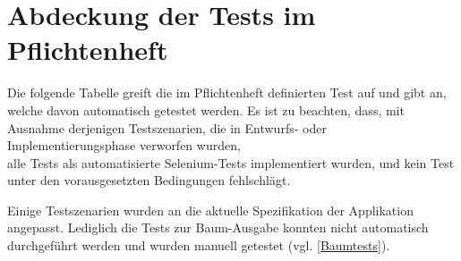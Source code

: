 \documentclass[parskip=full,11pt,openany]{scrreprt}
\begin{document}
\section{Abdeckung der Tests im Pflichtenheft}

Die folgende Tabelle greift die im Pflichtenheft definierten Test auf und gibt an,
welche davon automatisch getestet werden. 
Es ist zu beachten, dass, mit Ausnahme derjenigen Testszenarien, die in Entwurfs- oder
Implementierungsphase verworfen wurden, \\ alle Tests als automatisierte Selenium-Tests implementiert wurden, und kein Test unter den vorausgesetzten Bedingungen fehlschlägt.

Einige Testszenarien wurden an die aktuelle Spezifikation der Applikation angepasst. 
Lediglich die Tests zur Baum-Ausgabe konnten nicht automatisch durchgeführt werden und wurden manuell getestet (vgl. \ref{Baumtests}).
\end{document}
